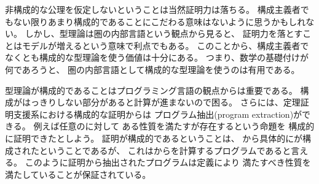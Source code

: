 \documentclass[index]{subfiles}
\begin{document}
非構成的な公理を仮定しないということは当然証明力は落ちる。
構成主義者でもない限りあまり構成的であることにこだわる意味はないように思うかもしれない。
しかし、型理論は圏の内部言語という観点から見ると、
証明力を落とすことはモデルが増えるという意味で利点でもある。
このことから、構成主義者でなくとも構成的な型理論を使う価値は十分にある。
つまり、数学の基礎付けが何であろうと、
圏の内部言語として構成的な型理論を使うのは有用である。

型理論が構成的であることはプログラミング言語の観点からは重要である。
構成がはっきりしない部分があると計算が進まないので困る。
さらには、定理証明支援系における構成的な証明からは
プログラム抽出(program extraction)ができる。
例えば任意のに対して
ある性質を満たすが存在するという命題を
構成的に証明できたとしよう。
証明が構成的であるということは、
から具体的にが構成されたということであるが、
これはからを計算するプログラムであると言える。
このように証明から抽出されたプログラムは定義により
満たすべき性質を満たしていることが保証されている。
\end{document}
